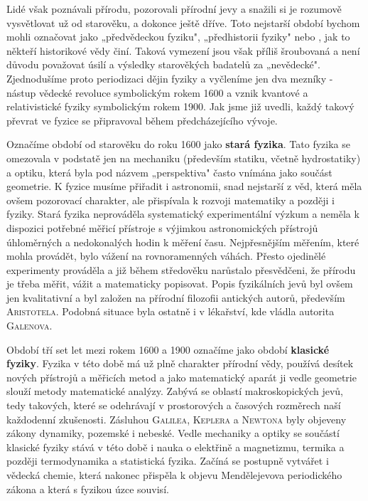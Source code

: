 
      Lidé však poznávali přírodu, pozorovali přírodní jevy a snažili si je rozumově vysvětlovat už
      od starověku, a dokonce ještě dříve. Toto nejstarší období bychom mohli označovat jako
      „předvědeckou fyziku", „předhistorii fyziky" nebo \emph{}, jak to někteří historikové vědy činí.
      Taková vymezení jsou však příliš šroubovaná a není důvodu považovat úsilí a výsledky
      starověkých badatelů za „nevědecké". Zjednodušíme proto periodizaci dějin fyziky a vyčleníme
      jen dva mezníky - nástup vědecké revoluce symbolickým rokem 1600 a vznik kvantové a
      relativistické fyziky symbolickým rokem 1900. Jak jsme již uvedli, každý takový převrat ve
      fyzice se připravoval během předcházejícího vývoje.

      Označíme období od starověku do roku 1600 jako \textbf{stará fyzika}. Tato fyzika se omezovala
      v podstatě jen na mechaniku (především statiku, včetně hydrostatiky) a optiku, která byla pod
      názvem „perspektiva" často vnímána jako součást geometrie. K fyzice musíme přiřadit i
      astronomii, snad nejstarší z věd, která měla ovšem pozorovací charakter, ale přispívala k
      rozvoji matematiky a později i fyziky. Stará fyzika neprováděla systematický experimentální
      výzkum a neměla k dispozici potřebné měřicí přístroje s výjimkou astronomických přístrojů
      úhloměrných a nedokonalých hodin k měření času. Nejpřesnějším měřením, které mohla provádět,
      bylo vážení na rovnoramenných váhách. Přesto ojedinělé experimenty prováděla a již během
      středověku narůstalo přesvědčeni, že přírodu je třeba měřit, vážit a matematicky popisovat.
      Popis fyzikálních jevů byl ovšem jen kvalitativní a byl založen na přírodní filozofii
      antických autorů, především \textsc{Aristotela}. Podobná situace byla ostatně i v lékařství,
      kde vládla autorita \textsc{Galenova}.


      Období tří set let mezi rokem 1600 a 1900 označíme jako období \textbf{klasické fyziky}.
      Fyzika v této době má už plně charakter přírodní vědy, používá desítek nových přístrojů a
      měřicích metod a jako matematický aparát ji vedle geometrie slouží metody matematické analýzy.
      Zabývá se oblastí makroskopických jevů, tedy takových, které se odehrávají v prostorových a
      časových rozměrech naší každodenní zkušenosti. Zásluhou \textsc{Galilea}, \textsc{Keplera} a
      \textsc{Newtona} byly objeveny zákony dynamiky, pozemské i nebeské. Vedle mechaniky a optiky
      se součástí klasické fyziky stává v této době i nauka o elektřině a magnetizmu, termika a
      později termodynamika a statistická fyzika. Začíná se postupně vytvářet i vědecká chemie,
      která nakonec přispěla k objevu Mendělejevova periodického zákona a která s fyzikou úzce
      souvisí.

